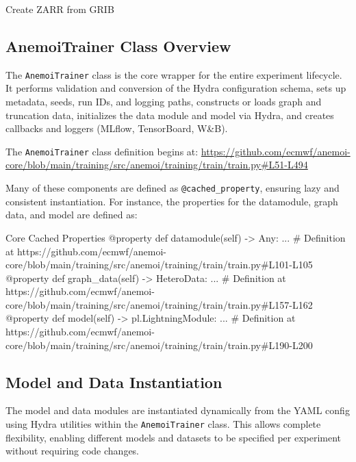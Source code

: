 \begin{codeonly}{Create ZARR from GRIB}
%
\subsection{AnemoiTrainer Class Overview}

The \texttt{AnemoiTrainer} class is the core wrapper for the entire experiment lifecycle. It performs validation and conversion of the Hydra configuration schema, sets up metadata, seeds, run IDs, and logging paths, constructs or loads graph and truncation data, initializes the data module and model via Hydra, and creates callbacks and loggers (MLflow, TensorBoard, W\&B).

The \texttt{AnemoiTrainer} class definition begins at:
\url{https://github.com/ecmwf/anemoi-core/blob/main/training/src/anemoi/training/train/train.py#L51-L494}

Many of these components are defined as \texttt{@cached\_property}, ensuring lazy and consistent instantiation. For instance, the properties for the datamodule, graph data, and model are defined as:

\begin{codeonly}{Core Cached Properties}
@property
def datamodule(self) -> Any: ... # Definition at https://github.com/ecmwf/anemoi-core/blob/main/training/src/anemoi/training/train/train.py#L101-L105
@property
def graph_data(self) -> HeteroData: ... # Definition at https://github.com/ecmwf/anemoi-core/blob/main/training/src/anemoi/training/train/train.py#L157-L162
@property
def model(self) -> pl.LightningModule: ... # Definition at https://github.com/ecmwf/anemoi-core/blob/main/training/src/anemoi/training/train/train.py#L190-L200
\end{codeonly}

%
\subsection{Model and Data Instantiation}

The model and data modules are instantiated dynamically from the YAML config using Hydra utilities within the \texttt{AnemoiTrainer} class. This allows complete flexibility, enabling different models and datasets to be specified per experiment without requiring code changes.


\end{codeonly}
